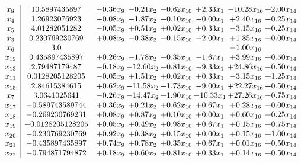 \documentclass[8pt]{article}
\begin{document}
\[\begin{array}{c| c c@{\hskip 2pt} c@{\hskip 2pt} c@{\hskip 2pt} c@{\hskip 2pt} c@{\hskip 2pt} c@{\hskip 2pt} }
 x_{8}   &  10.5897435897 & -0.36 x_{9} & -0.21 x_{2} & -0.62 x_{10} & +  2.33 x_{1} & -10.28 x_{16} & +  2.00 x_{14}\\
 x_{4}   &  1.26923076923 & -0.08 x_{9} & -1.87 x_{2} & -0.10 x_{10} & -0.00 x_{1} & +  2.40 x_{16} & -0.25 x_{14}\\
 x_{5}   &  4.01282051282 & -0.05 x_{9} & +  0.51 x_{2} & +  0.02 x_{10} & +  0.33 x_{1} & -3.15 x_{16} & +  0.25 x_{14}\\
 x_{3}   &  0.230769230769 & +  0.08 x_{9} & -0.38 x_{2} & -0.15 x_{10} & -2.00 x_{1} & +  1.85 x_{16} & +  0.00 x_{14}\\
 x_{6}   &  3.0  &    &    &    &   & -1.00 x_{16} &   \\
 x_{12}   &  0.435897435897 & +  0.26 x_{9} & -1.78 x_{2} & -0.35 x_{10} & -1.67 x_{1} & +  3.99 x_{16} & +  0.50 x_{14}\\
 x_{13}   &  2.79487179487 & -0.18 x_{9} & -12.60 x_{2} & -0.81 x_{10} & -9.33 x_{1} & + 24.86 x_{16} & -0.50 x_{14}\\
 x_{11}   &  0.0128205128205 & -0.05 x_{9} & +  1.51 x_{2} & +  0.02 x_{10} & +  0.33 x_{1} & -3.15 x_{16} & +  1.25 x_{14}\\
 x_{15}   &  2.84615384615 & +  0.62 x_{9} & -11.58 x_{2} & -1.73 x_{10} & -9.00 x_{1} & + 22.27 x_{16} & +  0.50 x_{14}\\
 x_{7}   &  3.0641025641 & -0.26 x_{9} & -14.47 x_{2} & -1.90 x_{10} & -10.33 x_{1} & + 27.26 x_{16} & -0.75 x_{14}\\
 x_{17}   &  -0.589743589744 & +  0.36 x_{9} & +  0.21 x_{2} & +  0.62 x_{10} & +  0.67 x_{1} & +  0.28 x_{16} & +  0.00 x_{14}\\
 x_{18}   &  -0.269230769231 & +  0.08 x_{9} & +  0.87 x_{2} & +  0.10 x_{10} & +  0.00 x_{1} & +  0.60 x_{16} & +  0.25 x_{14}\\
 x_{19}   &  -0.0128205128205 & +  0.05 x_{9} & +  0.49 x_{2} & +  0.98 x_{10} & +  0.67 x_{1} & +  0.15 x_{16} & +  0.75 x_{14}\\
 x_{20}   &  -0.230769230769 & +  0.92 x_{9} & +  0.38 x_{2} & +  0.15 x_{10} & +  0.00 x_{1} & +  0.15 x_{16} & +  1.00 x_{14}\\
 x_{21}   &  -0.435897435897 & +  0.74 x_{9} & +  0.78 x_{2} & +  0.35 x_{10} & +  0.67 x_{1} & +  0.01 x_{16} & +  0.50 x_{14}\\
 x_{22}   &  -0.794871794872 & +  0.18 x_{9} & +  0.60 x_{2} & +  0.81 x_{10} & +  0.33 x_{1} & +  0.14 x_{16} & +  0.50 x_{14}\\

\end{array}\]
\end{document}
